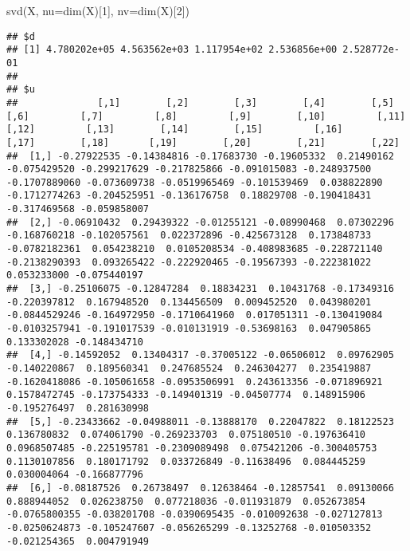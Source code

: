 \documentclass[
]{book}
\newenvironment{Shaded}{\begin{snugshade}}{\end{snugshade}}
\newcommand{\AttributeTok}[1]{\textcolor[rgb]{0.77,0.63,0.00}{#1}}
\newcommand{\DecValTok}[1]{\textcolor[rgb]{0.00,0.00,0.81}{#1}}
\newcommand{\FunctionTok}[1]{\textcolor[rgb]{0.00,0.00,0.00}{#1}}
\newcommand{\NormalTok}[1]{#1}
\begin{document}
\begin{Shaded}
\begin{Highlighting}[]
\FunctionTok{svd}\NormalTok{(X, }\AttributeTok{nu=}\FunctionTok{dim}\NormalTok{(X)[}\DecValTok{1}\NormalTok{], }\AttributeTok{nv=}\FunctionTok{dim}\NormalTok{(X)[}\DecValTok{2}\NormalTok{])}
\end{Highlighting}
\end{Shaded}

\begin{verbatim}
## $d
## [1] 4.780202e+05 4.563562e+03 1.117954e+02 2.536856e+00 2.528772e-01
## 
## $u
##              [,1]        [,2]        [,3]        [,4]        [,5]         [,6]         [,7]         [,8]         [,9]        [,10]         [,11]        [,12]         [,13]        [,14]        [,15]         [,16]        [,17]        [,18]       [,19]        [,20]        [,21]        [,22]
##  [1,] -0.27922535 -0.14384816 -0.17683730 -0.19605332  0.21490162 -0.075429520 -0.299217629 -0.217825866 -0.091015083 -0.248937500 -0.1707889060 -0.073609738 -0.0519965469 -0.101539469  0.038822890 -0.1712774263 -0.204525951 -0.136176758  0.18829708 -0.190418431 -0.317469568 -0.059858007
##  [2,] -0.06910432  0.29439322 -0.01255121 -0.08990468  0.07302296 -0.168760218 -0.102057561  0.022372896 -0.425673128  0.173848733 -0.0782182361  0.054238210  0.0105208534 -0.408983685 -0.228721140 -0.2138290393  0.093265422 -0.222920465 -0.19567393 -0.222381022  0.053233000 -0.075440197
##  [3,] -0.25106075 -0.12847284  0.18834231  0.10431768 -0.17349316 -0.220397812  0.167948520  0.134456509  0.009452520  0.043980201 -0.0844529246 -0.164972950 -0.1710641960  0.017051311 -0.130419084 -0.0103257941 -0.191017539 -0.010131919 -0.53698163  0.047905865  0.133302028 -0.148434710
##  [4,] -0.14592052  0.13404317 -0.37005122 -0.06506012  0.09762905 -0.140220867  0.189560341  0.247685524  0.246304277  0.235419887 -0.1620418086 -0.105061658 -0.0953506991  0.243613356 -0.071896921  0.1578472745 -0.173754333 -0.149401319 -0.04507774  0.148915906 -0.195276497  0.281630998
##  [5,] -0.23433662 -0.04988011 -0.13888170  0.22047822  0.18122523  0.136780832  0.074061790 -0.269233703  0.075180510 -0.197636410  0.0968507485 -0.225195781 -0.2309089498  0.075421206 -0.300405753  0.1130107856  0.180171792  0.033726849 -0.11638496  0.084445259  0.030004064 -0.166877796
##  [6,] -0.08187526  0.26738497  0.12638464 -0.12857541  0.09130066  0.888944052  0.026238750  0.077218036 -0.011931879  0.052673854 -0.0765800355 -0.038201708 -0.0390695435 -0.010092638 -0.027127813 -0.0250624873 -0.105247607 -0.056265299 -0.13252768 -0.010503352 -0.021254365  0.004791949

\end{verbatim}
\end{document}
